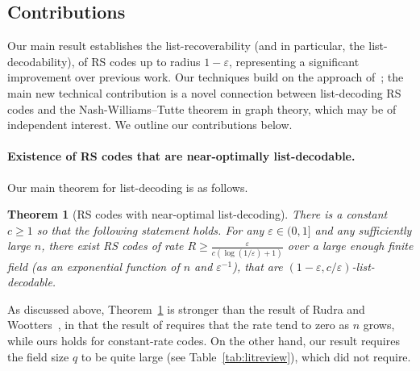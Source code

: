 \documentclass[11pt]{article}
\newtheorem{theorem}{Theorem}[section]
\newcommand\black[1]{{\color{black} #1}}
\renewcommand{\epsilon}{\varepsilon}
\newcommand{\eps}{\epsilon}
\begin{document}
\subsection{Contributions}
Our main result establishes the list-recoverability (and in particular, the list-decodability), of RS codes up to radius $1 - \eps$, representing a significant improvement over previous work.
Our techniques build on the approach of~\cite{shangguan2019combinatorial0}; the main new technical contribution is a novel connection between list-decoding RS codes and the Nash-Williams--Tutte theorem in graph theory, which may be of independent interest.
%
We outline our contributions below.

\paragraph{Existence of RS codes that are near-optimally list-decodable.}
Our main theorem for list-decoding is as follows.
\begin{theorem}[RS codes with near-optimal list-decoding]\label{thm:main-LD}
There is a constant $c \geq 1$ so that the following statement holds.
For any $\eps \in (0,1]$ and any sufficiently large $n$, there exist RS codes of rate $R \geq \frac{ \eps}{c (\log(1/\eps) + 1)}$ over a large enough finite field (as an \black{exponential} function of $n$ and $\eps^{-1}$), that are $(1 - \eps, c/\eps)$-list-decodable.
\end{theorem}

As discussed above, Theorem~\ref{thm:main-LD} is stronger than the result of Rudra and Wootters~\cite{Rudra-Wootters}, in that the result of \cite{Rudra-Wootters} requires that the rate tend to zero as $n$ grows, while ours holds for constant-rate codes.
On the other hand, our result requires the field size $q$ to be quite large (see Table~\ref{tab:litreview}), which \cite{Rudra-Wootters} did not require.
\end{document}
